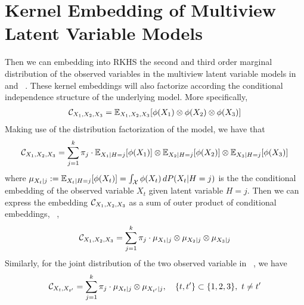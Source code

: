 \documentclass[11pt]{article}
\begin{document}
\section{Kernel Embedding of Multiview Latent Variable Models}

Then we can embedding into RKHS the second and third order marginal distribution of the observed variables in the multiview latent variable models in \,  and \, . These kernel embeddings will also factorize according the conditional independence structure of the underlying model. More specifically,
\begin{align*}
  \mathcal{C}_{X_1,X_2,X_3}
  = \mathbb{E}_{X_1,X_2,X_3}[\phi(X_1)\otimes \phi(X_2) \otimes \phi(X_3)]
\end{align*}
Making use of the distribution factorization of the model, we have that
\begin{align*}
  \mathcal{C}_{X_1,X_2,X_3} =
  \sum_{j=1}^k \pi_j \cdot \mathbb{E}_{X_1| H=j}[\phi(X_1)]\otimes \mathbb{E}_{X_2|H=j} [\phi(X_2)] \otimes \mathbb{E}_{X_3|H=j}[\phi(X_3)]
\end{align*}
where $\mu_{X_t|j}:=\mathbb{E}_{X_t| H=j}[\phi(X_t)] = \int_{\mathcal{X}} \phi(X_t)\, d P(X_t|H=j)$ is the
the conditional embedding of the observed variable $X_t$ given latent variable $H=j$.
Then we can express the embedding $\mathcal{C}_{X_1,X_2,X_3}$ as a sum of outer product of conditional embeddings, \, \ie,
\begin{align*}
  \mathcal{C}_{X_1,X_2,X_3}
  = \sum_{j=1}^k \pi_j \cdot \mu_{X_1|j} \otimes \mu_{X_2|j} \otimes \mu_{X_3|j}
\end{align*}
Similarly, for the joint distribution of the two observed variable in \, , we have
\begin{align*}
  \mathcal{C}_{X_t,X_{t'}}
  = \sum_{j=1}^k \pi_j \cdot \mu_{X_t|j} \otimes \mu_{X_{t'}|j},\quad \{t,t'\} \subset \{1,2,3\},\ t\neq t'
\end{align*}


\end{document}
